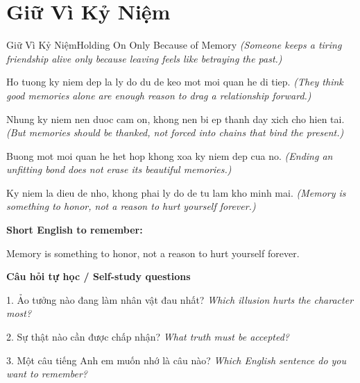 \section{Giữ Vì Kỷ Niệm}
\begin{truyen}{Giữ Vì Kỷ Niệm}{Holding On Only Because of Memory}
\textit{(Someone keeps a tiring friendship alive only because leaving feels like betraying the past.)}

Ho tuong ky niem dep la ly do du de keo mot moi quan he di tiep.
\textit{(They think good memories alone are enough reason to drag a relationship forward.)}

Nhung ky niem nen duoc cam on, khong nen bi ep thanh day xich cho hien tai.
\textit{(But memories should be thanked, not forced into chains that bind the present.)}

Buong mot moi quan he het hop khong xoa ky niem dep cua no.
\textit{(Ending an unfitting bond does not erase its beautiful memories.)}

\end{truyen}

\begin{baihoc}
Ky niem la dieu de nho, khong phai ly do de tu lam kho minh mai.
\textit{(Memory is something to honor, not a reason to hurt yourself forever.)}
\end{baihoc}

\begin{ghinhoanh}
\textbf{Short English to remember:}

Memory is something to honor, not a reason to hurt yourself forever.

\end{ghinhoanh}

\begin{tuhocnhanh}
\textbf{Câu hỏi tự học / Self-study questions}

1. Ảo tưởng nào đang làm nhân vật đau nhất? \textit{Which illusion hurts the character most?}

2. Sự thật nào cần được chấp nhận? \textit{What truth must be accepted?}

3. Một câu tiếng Anh em muốn nhớ là câu nào? \textit{Which English sentence do you want to remember?}
\end{tuhocnhanh}
\ngancach


